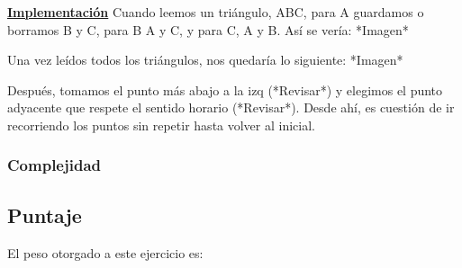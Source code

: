 \underline{\textbf{Implementación}}
Cuando leemos un triángulo,  ABC, para A guardamos o borramos B y C, para B A y C, y para C, A y B. Así se vería:
*Imagen*

Una vez leídos todos los triángulos, nos quedaría lo siguiente:
*Imagen*

Después, tomamos el punto más abajo a la izq (*Revisar*) y elegimos el punto adyacente que respete el sentido horario (*Revisar*). Desde ahí, es cuestión de ir recorriendo los puntos sin repetir hasta volver al inicial.
\subsubsection{Complejidad}


\subsection{Puntaje}
El peso otorgado a este ejercicio es:
